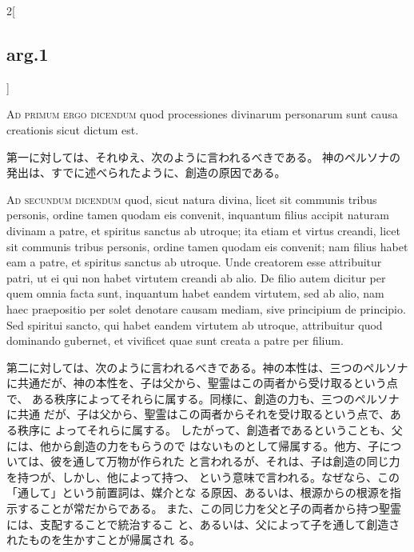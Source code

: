 \documentclass[paper=a4paper,fontsize=10pt,jafontsize=9pt,titlepage]{jlreq}
\begin{document}
\begin{paracol}{2}[\subsection{arg.1}]
\switchcolumn*[\subsection{ad.1}]

{\scshape Ad primum ergo dicendum} quod processiones
divinarum personarum sunt causa creationis sicut dictum est.

\switchcolumn

第一に対しては、それゆえ、次のように言われるべきである。
神のペルソナの発出は、すでに述べられたように、創造の原因である。

\switchcolumn*[\subsection{ad.2}]

{\scshape Ad secundum dicendum} quod, sicut natura
divina, licet sit communis tribus personis, ordine tamen quodam eis
convenit, inquantum filius accipit naturam divinam a patre, et spiritus
sanctus ab utroque; ita etiam et virtus creandi, licet sit communis
tribus personis, ordine tamen quodam eis convenit; nam filius habet eam
a patre, et spiritus sanctus ab utroque. Unde creatorem esse attribuitur
patri, ut ei qui non habet virtutem creandi ab alio. De filio autem
dicitur per quem omnia facta sunt, inquantum habet eandem virtutem, sed
ab alio, nam haec praepositio per solet denotare causam mediam, sive
principium de principio. Sed spiritui sancto, qui habet eandem virtutem
ab utroque, attribuitur quod dominando gubernet, et vivificet quae sunt
creata a patre per filium.

\switchcolumn

第二に対しては、次のように言われるべきである。神の本性は、三つのペルソナ
に共通だが、神の本性を、子は父から、聖霊はこの両者から受け取るという点で、
ある秩序によってそれらに属する。同様に、創造の力も、三つのペルソナに共通
だが、子は父から、聖霊はこの両者からそれを受け取るという点で、ある秩序に
よってそれらに属する。
したがって、創造者であるということも、父には、他から創造の力をもらうので
 はないものとして帰属する。他方、子については、彼を通して万物が作られた
 と言われるが、それは、子は創造の同じ力を持つが、しかし、他によって持つ、
 という意味で言われる。なぜなら、この「通して」という前置詞は、媒介とな
 る原因、あるいは、根源からの根源を指示することが常だからである。
また、この同じ力を父と子の両者から持つ聖霊には、支配することで統治するこ
 と、あるいは、父によって子を通して創造されたものを生かすことが帰属され
 る。

\switchcolumn*


\end{paracol}
\end{document}
